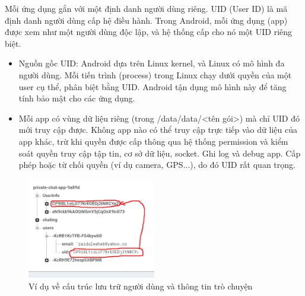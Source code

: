 \renewcommand{\labelitemi}{--}    
        Mỗi ứng dụng gắn với một định danh người dùng riêng. UID (User ID) là mã định danh người dùng cấp hệ điều hành. Trong Android, mỗi ứng dụng (app) được xem như một người dùng độc lập, và hệ thống cấp cho nó một UID riêng biệt.
        \setlength{\leftmargini}{1.5cm}
        \begin{itemize}
            \item Nguồn gốc UID: Android dựa trên Linux kernel, và Linux có mô hình đa người dùng. Mỗi tiến trình (process) trong Linux chạy dưới quyền của một user cụ thể, phân biệt bằng UID. Android tận dụng mô hình này để tăng tính bảo mật cho các ứng dụng.
            \item Mỗi app có vùng dữ liệu riêng (trong /data/data/<tên gói>) mà chỉ UID đó mới truy cập được. Không app nào có thể truy cập trực tiếp vào dữ liệu của app khác, trừ khi quyền được cấp thông qua hệ thống permission và kiểm soát quyền truy cập tập tin, cơ sở dữ liệu, socket. Ghi log và debug app. Cấp phép hoặc từ chối quyền (ví dụ camera, GPS...), do đó UID rất quan trọng.
        \end{itemize}

        \begin{figure}[H] 
            \centering
            \includegraphics[width=0.5\textwidth]{images/uid.png}
            \caption{Ví dụ về cấu trúc lưu trữ người dùng và thông tin trò chuyện}
            \label{fig:android}
        \end{figure}

